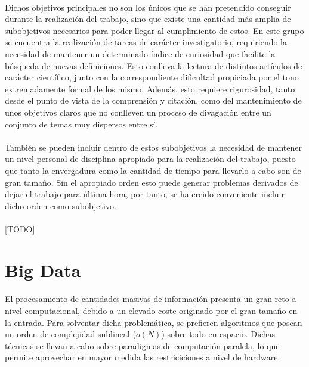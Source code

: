 \documentclass{subfiles}
\begin{document}
      \paragraph{}
      Dichos objetivos principales no son los únicos que se han pretendido conseguir durante la realización del trabajo, sino que existe una cantidad más amplia de subobjetivos necesarios para poder llegar al cumplimiento de estos. En este grupo se encuentra la realización de tareas de carácter investigatorio, requiriendo la necesidad de mantener un determinado índice de curiosidad que facilite la búsqueda de nuevas definiciones. Esto conlleva la lectura de distintos artículos de carácter científico, junto con la correspondiente dificultad propiciada por el tono extremadamente formal de los mismo. Además, esto requiere rigurosidad, tanto desde el punto de vista de la comprensión y citación, como del mantenimiento de unos objetivos claros que no conlleven un proceso de divagación entre un conjunto de temas muy dispersos entre sí.

      \paragraph{}
      También se pueden incluir dentro de estos subobjetivos la necesidad de mantener un nivel personal de disciplina apropiado para la realización del trabajo, puesto que tanto la envergadura como la cantidad de tiempo para llevarlo a cabo son de gran tamaño. Sin el apropiado orden esto puede generar problemas derivados de dejar el trabajo para última hora, por tanto, se ha creido conveniente incluir dicho orden como subobjetivo.

      \paragraph{}
      [TODO]

    \section{Big Data}
    \label{sec:introduction_big_data}

      \paragraph{}
      El procesamiento de cantidades masivas de información presenta un gran reto a nivel computacional, debido a un elevado coste originado por el gran tamaño en la entrada. Para solventar dicha problemática, se prefieren algoritmos que posean un orden de complejidad sublineal ($o(N)$) sobre todo en espacio. Dichas técnicas se llevan a cabo sobre paradigmas de computación paralela, lo que permite aprovechar en mayor medida las restriciciones a nivel de hardware.
\end{document}
